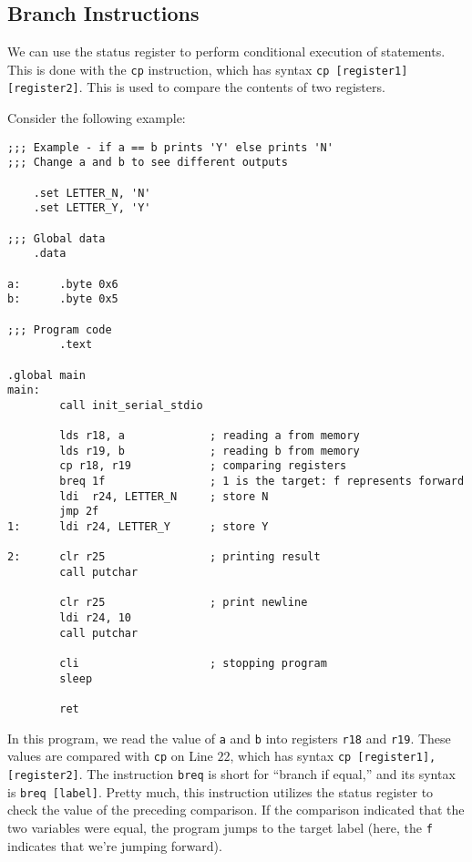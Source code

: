 \subsection{Branch Instructions}

We can use the status register to perform conditional execution of statements. This is done with the \verb!cp! instruction, which has syntax \verb!cp [register1] [register2]!. This is used to compare the contents of two registers.

Consider the following example:

\begin{lstlisting}
;;; Example - if a == b prints 'Y' else prints 'N'
;;; Change a and b to see different outputs

    .set LETTER_N, 'N'
    .set LETTER_Y, 'Y'

;;; Global data
    .data

a:      .byte 0x6              
b:      .byte 0x5

;;; Program code
        .text                 

.global main                  
main:                          
        call init_serial_stdio

        lds r18, a             ; reading a from memory  
        lds r19, b             ; reading b from memory
        cp r18, r19            ; comparing registers
        breq 1f                ; 1 is the target: f represents forward
        ldi  r24, LETTER_N     ; store N
        jmp 2f
1:      ldi r24, LETTER_Y      ; store Y

2:      clr r25                ; printing result
        call putchar          

        clr r25                ; print newline
        ldi r24, 10            
        call putchar
    
        cli                    ; stopping program
        sleep                          

        ret                   
\end{lstlisting}

In this program, we read the value of \verb!a! and \verb!b! into registers \verb!r18! and \verb!r19!. These values are compared with \verb!cp! on Line $22$, which has syntax \verb!cp [register1], [register2]!. The instruction \verb!breq! is short for ``branch if equal,'' and its syntax is \verb!breq [label]!. Pretty much, this instruction utilizes the status register to check the value of the preceding comparison. If the comparison indicated that the two variables were equal, the program jumps to the target label (here, the \verb!f! indicates that we're jumping forward). 

